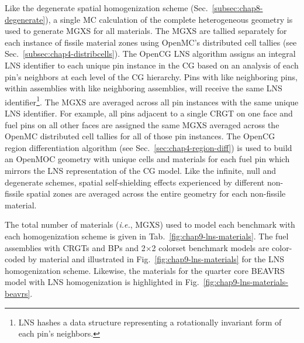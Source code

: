 Like the degenerate spatial homogenization scheme (Sec.~\ref{subsec:chap8-degenerate}), a single \ac{MC} calculation of the complete heterogeneous geometry is used to generate \ac{MGXS} for all materials. The \ac{MGXS} are tallied separately for each instance of fissile material zones using OpenMC's distributed cell tallies (see Sec.~\ref{subsec:chap4-distribcells}). The OpenCG \ac{LNS} algorithm assigns an integral \ac{LNS} identifier to each unique pin instance in the \ac{CG} based on an analysis of each pin's neighbors at each level of the \ac{CG} hierarchy. Pins with like neighboring pins, within assemblies with like neighboring assemblies, will receive the same \ac{LNS} identifier\footnote{\ac{LNS} hashes a data structure representing a rotationally invariant form of each pin's neighbors.}. The \ac{MGXS} are averaged across all pin instances with the same unique \ac{LNS} identifier. For example, all pins adjacent to a single \ac{CRGT} on one face and fuel pins on all other faces are assigned the same \ac{MGXS} averaged across the OpenMC distributed cell tallies for all of those pin instances. The OpenCG region differentiation algorithm (see Sec.~\ref{sec:chap4-region-diff}) is used to build an OpenMOC geometry with unique cells and materials for each fuel pin which mirrors the \ac{LNS} representation of the \ac{CG} model. Like the infinite, null and degenerate schemes, spatial self-shielding effects experienced by different non-fissile spatial zones are averaged across the entire geometry for each non-fissile material.

The total number of materials (\textit{i.e.}, \ac{MGXS}) used to model each benchmark with each homogenization scheme is given in Tab.~\ref{fig:chap9-lns-materials}. The fuel assemblies with \acp{CRGT} and \acp{BP} and 2$\times$2 colorset benchmark models are color-coded by material and illustrated in Fig.~\ref{fig:chap9-lns-materials} for the \ac{LNS} homogenization scheme. Likewise, the materials for the quarter core \ac{BEAVRS} model with \ac{LNS} homogenization is highlighted in Fig.~\ref{fig:chap9-lns-materials-beavrs}. 

